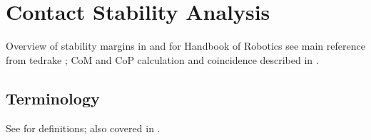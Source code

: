 

\section{Contact Stability Analysis}
Overview of stability margins in \cite{garcia2002classification} and for Handbook of Robotics see main reference from tedrake \cite{pratt2006velocity}; CoM and CoP calculation and coincidence described in \cite{sardain2004forces}.

\subsection{Terminology}
See \cite{vukobratovic2007towards} for definitions; also covered in \cite[Ch.48.3.7]{siciliano2016springer}.


